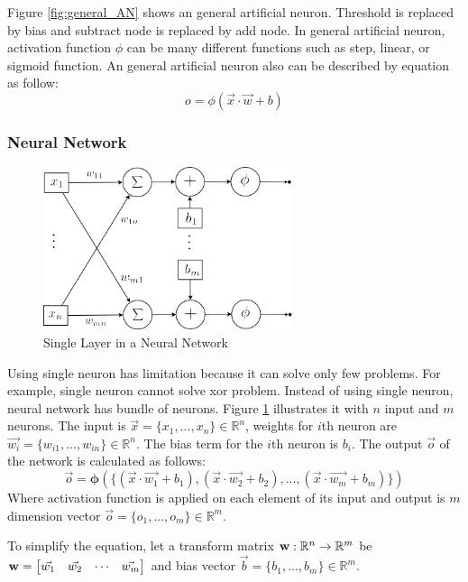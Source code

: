 \documentclass[draft,dvipsnames]{drexel-thesis}
\begin{document}
\begin{thesis}
Figure \ref{fig:general_AN} shows an general artificial neuron. Threshold is replaced by bias and subtract node is replaced by add node. In general artificial neuron, activation function $\phi$ can be many different functions such as step, linear, or sigmoid function. An general artificial neuron also can be described by equation as follow:
$$o = \phi(\vec{x}\cdot\vec{w}+b)$$


\subsubsection{Neural Network}\label{subsubsec:NN}

\begin{figure}[t!]
    \centering
    \includegraphics[width=0.65\textwidth]{pictures/figures/detail_NN.png}
    \caption{Single Layer in a Neural Network}
    \label{fig:detail_NN}
\end{figure}

Using single neuron has limitation because it can solve only few problems. For example, single neuron cannot solve xor problem. Instead of using single neuron, neural network has bundle of neurons. Figure \ref{fig:detail_NN} illustrates it with $n$ input and $m$ neurons. The input is $\vec{x} = \{x_1, ..., x_n\} \in \mathbb{R}^n$, weights for $i$th neuron are $\vec{w_i} = \{w_{i1}, ..., w_{in}\} \in \mathbb{R}^n$. The bias term for the $i$th neuron is $b_i$. The output $\vec{o}$ of the network is calculated as follows:
$$\vec{o} = \bm{\phi}(\{(\vec{x}\cdot\vec{w_1}+b_1),(\vec{x}\cdot\vec{w_2}+b_2),...,(\vec{x}\cdot\vec{w_m}+b_m)\})$$
Where activation function is applied on each element of its input and output is $m$ dimension vector $\vec{o} = \{o_1, ..., o_m\} \in \mathbb{R}^m$.

To simplify the equation, let a transform matrix $\bold{w}: \mathbb{R}^n \rightarrow \mathbb{R}^m$ be
$\bold{w}=
\begin{bmatrix}
	\vec{w_1} & \vec{w_2} & \cdots & \vec{w_m}
\end{bmatrix}$
and bias vector $\vec{b} = \{b_1, ..., b_m\} \in \mathbb{R}^m$.


\end{thesis}
\end{document}
